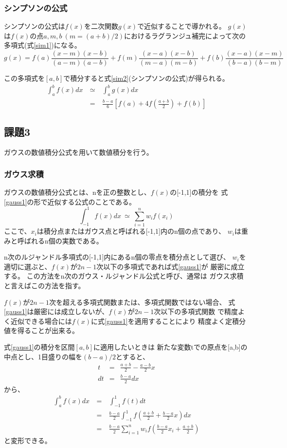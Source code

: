 \documentclass[dvipdfmx]{jsarticle}
\begin{document}
\subsubsection{シンプソンの公式}
シンプソンの公式は$f(x)$を二次関数$g(x)$で近似することで導かれる。
$g(x)$は$f(x)$の点$a,m,b~(m=(a+b)/2)$におけるラグランジュ補完によって次の多項式(式\ref{sim1})になる。
\begin{equation}
  g(x) = f(a)\frac{(x-m)(x-b)}{(a-m)(a-b)}+f(m)\frac{(x-a)(x-b)}{(m-a)(m-b)}+f(b)\frac{(x-a)(x-m)}{(b-a)(b-m)}
  \label{sim1}
\end{equation}

この多項式を$[a,b]$で積分すると式\ref{sim2}(シンプソンの公式)が得られる。
\begin{eqnarray}
  \int_a^b f(x)dx ~&\simeq&~ \int_a^b g(x)dx \nonumber \\
  &=&~ \frac{b-a}{6} \left[f(a)+4f(\frac{a+b}{2})+f(b)\right]
  \label{sim2}
\end{eqnarray}

\subsection{課題3}
ガウスの数値積分公式を用いて数値積分を行う。
\subsubsection{ガウス求積}
ガウスの数値積分公式とは、nを正の整数とし、$f(x)$の[-1,1]の積分を
式\ref{gauss1}の形で近似する公式のことである。
\begin{equation}
  \int_{-1}^{1}f(x)dx ~\simeq~ \sum_{i=1}^{n} w_i f(x_i)
  \label{gauss1}
\end{equation}
ここで、$x_i$は積分点またはガウス点と呼ばれる[-1,1]内のn個の点であり、
$w_i$は重みと呼ばれるn個の実数である。

n次のルジャンドル多項式の[-1,1]内にあるn個の零点を積分点として選び、
$w_i$を適切に選ぶと、$f(x)$が$2n-1$次以下の多項式であれば式\ref{gauss1}が
厳密に成立する。
この方法をn次のガウス・ルジャンドル公式と呼び、通常は
ガウス求積と言えばこの方法を指す。

$f(x)$が$2n-1$次を超える多項式関数または、多項式関数ではない場合、
式\ref{gauss1}は厳密には成立しないが、$f(x)$が$2n-1$次以下の多項式関数
で精度よく近似できる場合には$f(x)$に式\ref{gauss1}を適用することにより
精度よく定積分値を得ることが出来る。

式\ref{gauss1}の積分を区間$[a,b]$に適用したいときは
新たな変数tでの原点を[a,b]の中点とし、1目盛りの幅を$(b-a)/2$とすると、
\begin{eqnarray}
  t &=& \frac{a+b}{2} - \frac{a-b}{2}x \nonumber \\
  dt &=& \frac{b-a}{2}dx \nonumber
\end{eqnarray}
から、
\begin{eqnarray}
  \int_a^b f(x)dx ~&=&~ \int_{-1}^{1} f(t)dt \nonumber\\
  &=&~ \frac{b-a}{2} \int_{-1}^{1} f(\frac{a+b}{2} + \frac{b-a}{2}x)dx \\
  &=&~ \frac{b-a}{2} \sum_{i=1}^{n} w_i f(\frac{b-a}{2}x_i + \frac{a+b}{2})
  \label{gauss2}
\end{eqnarray}
と変形できる。
\end{document}
